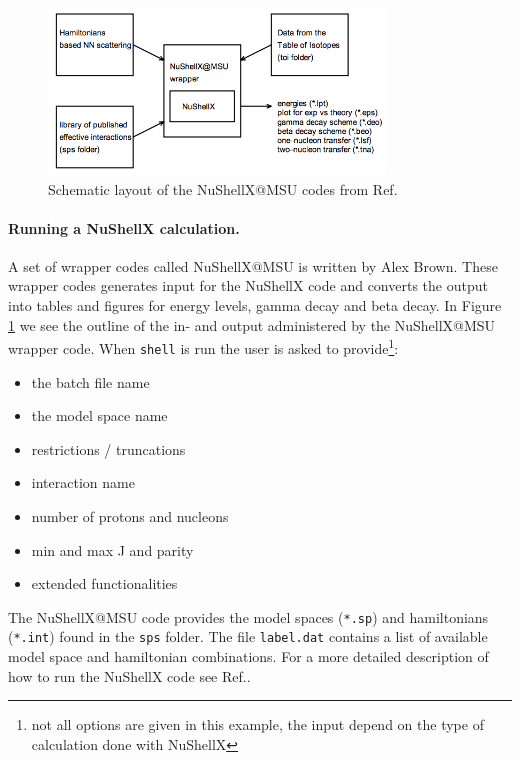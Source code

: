 \documentclass[twoside]{article}
\begin{document}
\begin{figure}[ht]
\centering
\includegraphics[width=0.8\textwidth]{nushellX_structure_from_ref.png}
\caption{Schematic layout of the NuShellX@MSU codes from Ref.\cite{ref: nushellx} }
\label{fig: nushellx_struct}
\end{figure}

\paragraph{Running a NuShellX calculation.} A set of wrapper codes called NuShellX@MSU is written by Alex Brown. These wrapper codes generates input for the NuShellX code and converts the output into tables and figures for energy levels, gamma decay and beta decay. In Figure \ref{fig: nushellx_struct} we see the outline of the in- and output administered by the NuShellX@MSU wrapper code. When \texttt{shell} is run the user is asked to provide\footnote{not all options are given in this example, the input depend on the type of calculation done with NuShellX}:

\begin{itemize}
\item the batch file name
\item the model space name
\item restrictions / truncations
\item interaction name
\item number of protons and nucleons
\item min and max J and parity
\item extended functionalities
\end{itemize}

The NuShellX@MSU code provides the model spaces (\texttt{*.sp}) and hamiltonians (\texttt{*.int}) found in the \texttt{sps} folder. The file \texttt{label.dat} contains a list of available model space and hamiltonian combinations. For a more detailed description of how to run the NuShellX code see Ref.\cite{help_file}.
\end{document}
